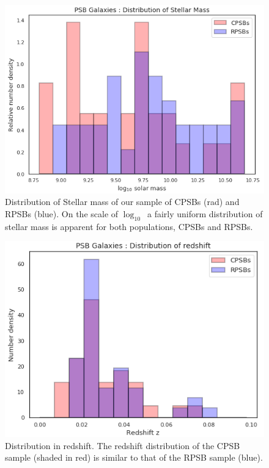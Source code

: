 \begin{figure}
    \centering
    \includegraphics[width=\columnwidth]{images/JupyterPlots/Dist-Stellar-Mass-All.png}
    \caption{Distribution of Stellar mass of our sample of CPSBs (rad) and RPSBs (blue). On the scale of $\log_{10}$\Msun\ a fairly uniform distribution of stellar mass is apparent for both populations, CPSBs and RPSBs.}
    \label{fig:stellar-mass-plot}
\end{figure}

\begin{figure}
    \centering
    \includegraphics[width=\columnwidth]{images/JupyterPlots/Dist-z-All.png}
    \caption[PSB distribution in redshift]{Distribution in redshift. The redshift distribution of the CPSB sample (shaded in red) is similar to that of the RPSB sample (blue).}
    \label{fig:redshift-plot}
\end{figure}

